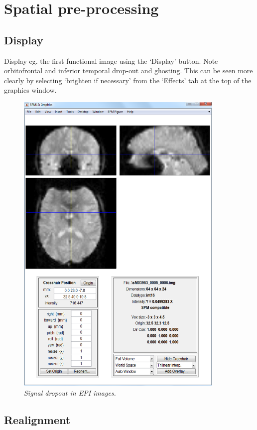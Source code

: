 \documentclass[a4paper,titlepage]{book}
\begin{document}
\section{Spatial pre-processing}

\subsection{Display}

Display eg. the first functional image using the 
`Display' button. Note orbitofrontal 
  and inferior temporal drop-out and ghosting. This 
  can be seen more clearly by selecting `brighten if necessary' from the `Effects' tab at the top of the 
  graphics window.
  \begin{figure}
\begin{center}
\includegraphics[width=100mm]{dropout}
\caption{\em Signal dropout in EPI images. \label{dropout}}
\end{center}
\end{figure}

\subsection{Realignment}
\end{document}
